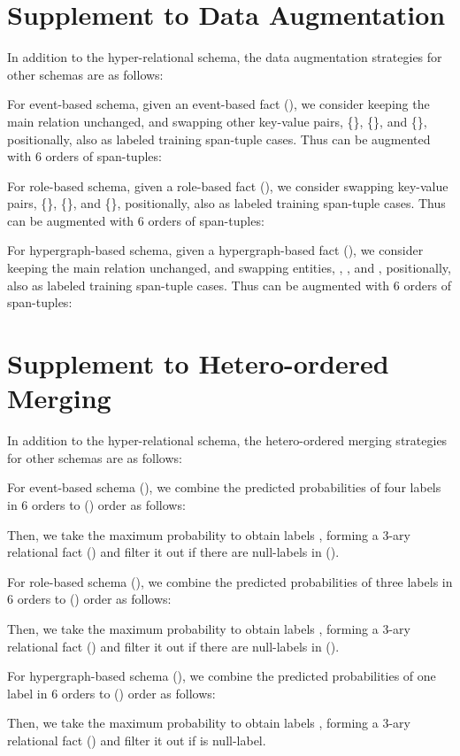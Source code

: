 \documentclass{article} \usepackage{iclr2024_conference,times}
\begin{document}
\section{Supplement to Data Augmentation}
\label{AppA}

In addition to the hyper-relational schema, the data augmentation strategies for other schemas are as follows:

For event-based schema, given an event-based fact (), we consider keeping the main relation  unchanged, and swapping other key-value pairs, \{\}, \{\}, and \{\}, positionally, also as labeled training span-tuple cases. Thus  can be augmented with 6 orders of span-tuples:


For role-based schema, given a role-based fact (), we consider swapping key-value pairs, \{\}, \{\}, and \{\}, positionally, also as labeled training span-tuple cases. Thus  can be augmented with 6 orders of span-tuples:


For hypergraph-based schema, given a hypergraph-based fact (), we consider keeping the main relation  unchanged, and swapping entities, , , and , positionally, also as labeled training span-tuple cases. Thus  can be augmented with 6 orders of span-tuples:



\section{Supplement to Hetero-ordered Merging}
\label{AppB}

In addition to the hyper-relational schema, the hetero-ordered merging strategies for other schemas are as follows:

For event-based schema (), we combine the predicted probabilities of four labels  in 6 orders to () order as follows:

Then, we take the maximum probability to obtain labels , forming a 3-ary relational fact () and filter it out if there are null-labels in ().

For role-based schema (), we combine the predicted probabilities of three labels  in 6 orders to () order as follows:

Then, we take the maximum probability to obtain labels , forming a 3-ary relational fact () and filter it out if there are null-labels in ().

For hypergraph-based schema (), we combine the predicted probabilities of one label  in 6 orders to () order as follows:

Then, we take the maximum probability to obtain labels , forming a 3-ary relational fact () and filter it out if  is null-label.
\end{document}
